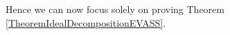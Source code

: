 Hence we can now focus solely on proving Theorem \ref{TheoremIdealDecompositionEVASS}.























































